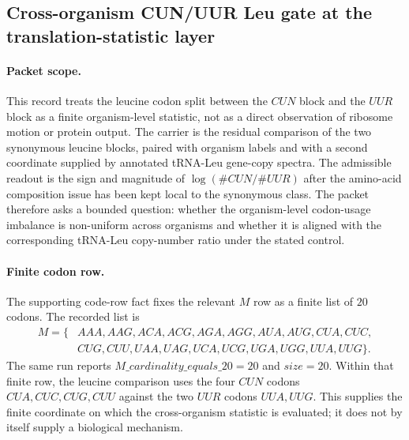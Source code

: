 \subsection{Cross-organism CUN/UUR Leu gate at the translation-statistic layer}\label{sec:cross-organism-cun-uur-leu-gate-translation-realization}

\paragraph{Packet scope.}
This record treats the leucine codon split between the $CUN$ block and the $UUR$ block as a finite organism-level statistic, not as a direct observation of ribosome motion or protein output.  The carrier is the residual comparison of the two synonymous leucine blocks, paired with organism labels and with a second coordinate supplied by annotated tRNA-Leu gene-copy spectra.  The admissible readout is the sign and magnitude of $\log(\#CUN/\#UUR)$ after the amino-acid composition issue has been kept local to the synonymous class.  The packet therefore asks a bounded question: whether the organism-level codon-usage imbalance is non-uniform across organisms and whether it is aligned with the corresponding tRNA-Leu copy-number ratio under the stated control.

\paragraph{Finite codon row.}
The supporting code-row fact fixes the relevant $M$ row as a finite list of $20$ codons.  The recorded list is
$$
\begin{aligned}
M=\{&AAA,AAG,ACA,ACG,AGA,AGG,AUA,AUG,CUA,CUC,\\
& CUG,CUU,UAA,UAG,UCA,UCG,UGA,UGG,UUA,UUG\}.
\end{aligned}
$$
The same run reports $M\_cardinality\_equals\_20=20$ and $size=20$.  Within that finite row, the leucine comparison uses the four $CUN$ codons $CUA,CUC,CUG,CUU$ against the two $UUR$ codons $UUA,UUG$.  This supplies the finite coordinate on which the cross-organism statistic is evaluated; it does not by itself supply a biological mechanism.

